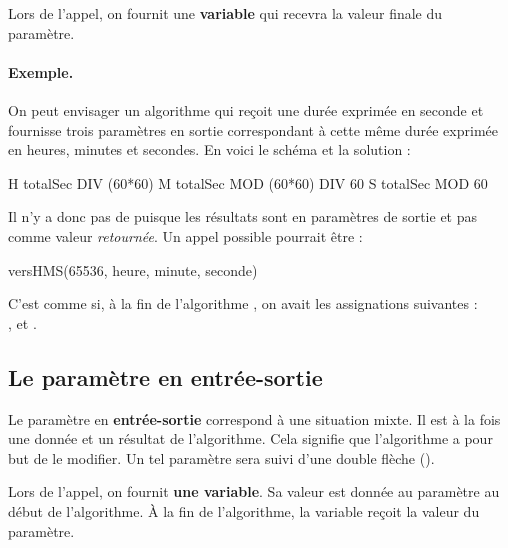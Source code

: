 		Lors de l'appel, on fournit une \textbf{variable}
		qui recevra la valeur finale du paramètre.
		
		\paragraph{Exemple.}
		On peut envisager un algorithme
		qui reçoit une durée exprimée en seconde
		et fournisse trois paramètres en sortie
		correspondant à cette même durée exprimée en heures, minutes et secondes.
		En voici le schéma et la solution :
		\begin{center}
		\end{center}
			
		\begin{LDA}
				\Let H \Gets totalSec DIV (60*60)
				\Let M \Gets totalSec MOD (60*60) DIV 60				
				\Let S \Gets totalSec MOD 60
			\EndAlgo
		\end{LDA}
		
		Il n'y a donc pas de \lda{\algorithmicreturn}
		puisque les résultats sont en paramètres de sortie et pas comme
		valeur \emph{retournée}.
		Un appel possible pourrait être :

		\begin{LDA}
			\Stmt versHMS(65536, heure, minute, seconde)
		\end{LDA}

		C'est comme si,
		à la fin de l'algorithme ,
		on avait les assignations suivantes :
		\\,  et .
				
	\subsection{Le paramètre en entrée-sortie}

		Le paramètre en \textbf{entrée-sortie}
		correspond à une situation mixte.
		Il est à la fois une donnée et un résultat de l'algorithme.
		Cela signifie que l'algorithme a pour but de le modifier.
		Un tel paramètre sera suivi d'une double flèche (\In\Out).
		
		Lors de l'appel, on fournit \textbf{une variable}.
		Sa valeur est donnée au paramètre au début de l'algorithme.
		À la fin de l'algorithme, la variable reçoit la valeur du paramètre.
		
